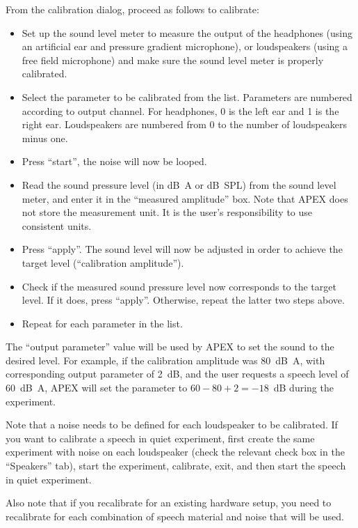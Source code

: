  From the calibration dialog, proceed as follows to calibrate: 

\begin{itemize}
\itemsep1pt\parskip0pt
\item
  Set up the sound level meter to measure the output of the headphones
  (using an artificial ear and pressure gradient microphone), or
  loudspeakers (using a free field microphone) and make sure the sound
  level meter is properly calibrated.
\item
  Select the parameter to be calibrated from the list. Parameters are
  numbered according to output channel. For headphones, 0 is the left
  ear and 1 is the right ear. Loudspeakers are numbered from 0 to the
  number of loudspeakers minus one.
\item
  Press ``start'', the noise will now be looped.
\item
  Read the sound pressure level (in dB~A or dB~SPL) from the sound level
  meter, and enter it in the ``measured amplitude'' box. Note that APEX
  does not store the measurement unit. It is the user's responsibility
  to use consistent units.
\item
  Press ``apply''. The sound level will now be adjusted in order to
  achieve the target level (``calibration amplitude'').
\item
  Check if the measured sound pressure level now corresponds to the
  target level. If it does, press ``apply''. Otherwise, repeat the
  latter two steps above.
\item
 Repeat for each parameter in the list.
\end{itemize}

The ``output parameter'' value will be used by APEX to set the sound to
the desired level. For example, if the calibration amplitude was 80~dB~A, with
corresponding output parameter of 2~dB, and the user requests a speech
level of 60~dB~A, APEX will set the parameter to $60-80+2=-18$~dB during
the experiment.

Note that a noise needs to be defined for each loudspeaker to be
calibrated. If you want to calibrate a speech in quiet experiment, first
create the same experiment with noise on each loudspeaker (check the
relevant check box in the ``Speakers'' tab), start the experiment,
calibrate, exit, and then start the speech in quiet experiment.

Also note that if you recalibrate for an existing hardware setup, you
need to recalibrate for each combination of speech material and noise
that will be used.


